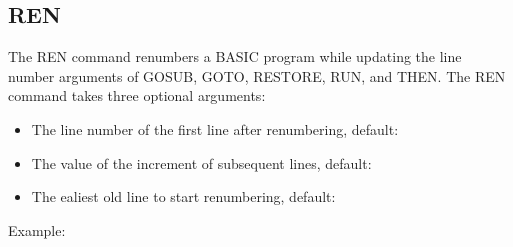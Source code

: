 
\subsection{REN}

The {\ttfamily REN} command renumbers a BASIC program while updating the line
number arguments of {\ttfamily GOSUB}, {\ttfamily GOTO}, {\ttfamily RESTORE},
{\ttfamily RUN}, and {\ttfamily THEN}.  The {\ttfamily REN} command takes three
optional arguments:\\

\begin{itemize}

	\item The line number of the first line after renumbering, default: {}

	\item The value of the increment of subsequent lines, default: {}

	\item The ealiest old line to start renumbering, default: {}

\end{itemize}

\vspace{16pt}

Example:\\


